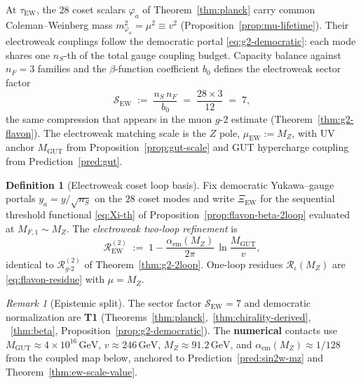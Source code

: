 \documentclass[11pt]{article}
\theoremstyle{plain}
\theoremstyle{definition}
\newtheorem{definition}[theorem]{Definition}
\theoremstyle{remark}
\newtheorem{remark}[theorem]{Remark}
\numberwithin{equation}{section}
\begin{document}
At $\tau_{\mathrm{EW}}$, the $28$ coset scalars $\varphi_a$ of
Theorem~\ref{thm:planck} carry common Coleman--Weinberg mass
$m_{\varphi_a}^2=\mu^2\equiv v^2$ (Proposition~\ref{prop:mu-lifetime}).
Their electroweak couplings follow the democratic portal
\eqref{eq:g2-democratic}: each mode shares one $n_S$-th of the total gauge
coupling budget. Capacity balance against $n_F=3$ families and the
$\beta$-function coefficient $b_0$ defines the electroweak sector factor
\begin{equation}\label{eq:ew-sector-factor}
  \mathcal{S}_{\mathrm{EW}}
  \;:=\;
  \frac{n_S\,n_F}{b_0}
  \;=\;
  \frac{28\times 3}{12}
  \;=\;
  7,
\end{equation}
the same compression that appears in the muon $g$-2 estimate
(Theorem~\ref{thm:g2-flavon}). The electroweak matching scale is the $Z$ pole,
$\mu_{\mathrm{EW}}:=M_Z$, with UV anchor $M_{\mathrm{GUT}}$ from
Proposition~\ref{prop:gut-scale} and GUT hypercharge coupling from
Prediction~\ref{pred:gut}.

\begin{definition}[Electroweak coset loop basis]\label{def:ew-coset-portal}
Fix democratic Yukawa--gauge portals $y_a=y/\sqrt{n_S}$ on the $28$ coset
modes and write $\Xi_{\mathrm{EW}}$ for the sequential threshold functional
\eqref{eq:Xi-th} of Proposition~\ref{prop:flavon-beta-2loop} evaluated at
$M_{F,1}\sim M_Z$. The \emph{electroweak two-loop refinement} is
\begin{equation}\label{eq:ew-2loop-factor}
  \mathcal{R}_{\mathrm{EW}}^{(2)}
  \;:=\;
  1 - \frac{\alpha_{\mathrm{em}}(M_Z)}{2\pi}\,
  \ln\!\frac{M_{\mathrm{GUT}}}{v},
\end{equation}
identical to $\mathcal{R}_{g\text{-}2}^{(2)}$ of Theorem~\ref{thm:g2-2loop}.
One-loop residues $\mathcal{R}_\iota(M_Z)$ are \eqref{eq:flavon-residue} with
$\mu=M_Z$.
\end{definition}

\begin{remark}[Epistemic split]
The sector factor $\mathcal{S}_{\mathrm{EW}}=7$ and democratic normalization
are \textbf{T1} (Theorems~\ref{thm:planck},~\ref{thm:chirality-derived},
~\ref{thm:beta}, Proposition~\ref{prop:g2-democratic}). The
\textbf{numerical} contacts use $M_{\mathrm{GUT}}\approx4\times10^{16}\,\mathrm{GeV}$,
$v\approx246\,\mathrm{GeV}$, $M_Z\approx91.2\,\mathrm{GeV}$, and
$\alpha_{\mathrm{em}}(M_Z)\approx1/128$ from the coupled map below, anchored
to Prediction~\ref{pred:sin2w-mz} and Theorem~\ref{thm:ew-scale-value}.
\end{remark}
\end{document}
